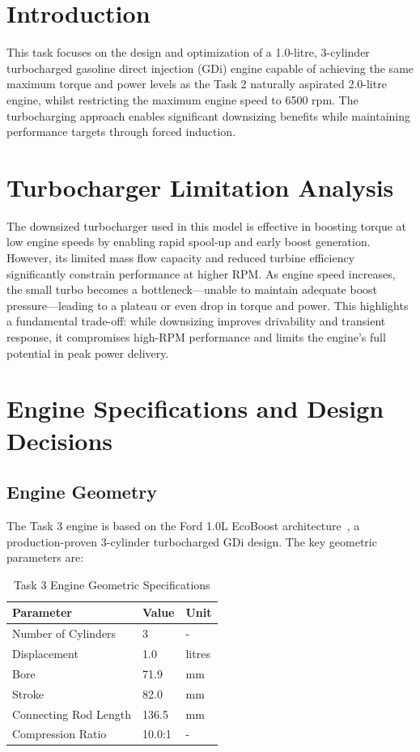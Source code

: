 \label{ch:task3}

\section{Introduction}

This task focuses on the design and optimization of a 1.0-litre, 3-cylinder turbocharged gasoline direct injection (GDi) engine capable of achieving the same maximum torque and power levels as the Task 2 naturally aspirated 2.0-litre engine, whilst restricting the maximum engine speed to 6500 rpm. The turbocharging approach enables significant downsizing benefits while maintaining performance targets through forced induction.

\section{Turbocharger Limitation Analysis}
The downsized turbocharger used in this model is effective in boosting torque at low engine speeds by enabling rapid spool-up and early boost generation. However, its limited mass flow capacity and reduced turbine efficiency significantly constrain performance at higher RPM. As engine speed increases, the small turbo becomes a bottleneck—unable to maintain adequate boost pressure—leading to a plateau or even drop in torque and power. This highlights a fundamental trade-off: while downsizing improves drivability and transient response, it compromises high-RPM performance and limits the engine's full potential in peak power delivery.


\section{Engine Specifications and Design Decisions}

\subsection{Engine Geometry}

The Task 3 engine is based on the Ford 1.0L EcoBoost architecture~\cite{ford_ecoboost}, a production-proven 3-cylinder turbocharged GDi design. The key geometric parameters are:

\begin{table}[H]
\centering
\caption{Task 3 Engine Geometric Specifications}
\label{tab:task3_geometry}
\small
\begin{tabular}{@{}lll@{}}
\toprule
\textbf{Parameter} & \textbf{Value} & \textbf{Unit} \\
\midrule
Number of Cylinders & 3 & - \\
Displacement & 1.0 & litres \\
Bore & 71.9 & mm \\
Stroke & 82.0 & mm \\
Connecting Rod Length & 136.5 & mm \\
Compression Ratio & 10.0:1 & - \\
\bottomrule
\end{tabular}
\end{table}

